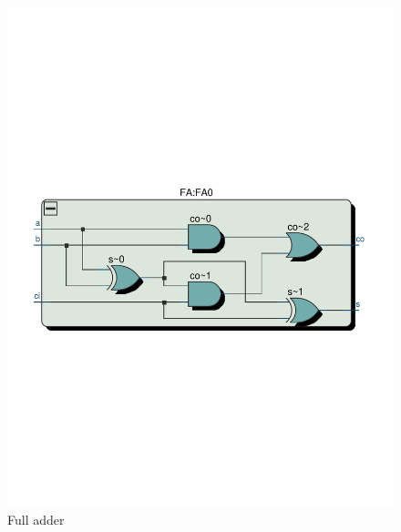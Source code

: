 \documentclass[13pt,a4paper]{report}
\begin{document}
\begin{figure}[H]
\centering
\includegraphics[scale=0.6, clip, trim={0cm 10cm 0cm 10.6cm}]{images/Exc1_FA_RTL.pdf}
\caption*{Full adder}
\end{figure}
\end{document}
